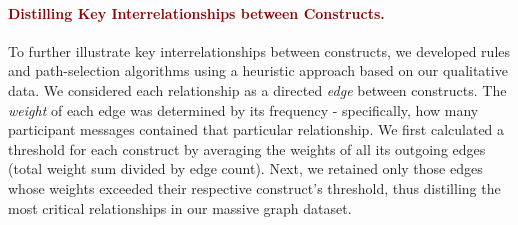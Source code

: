 \paragraph{\textcolor{darkred}{\textbf{Distilling Key Interrelationships between Constructs.}}}
To further illustrate key interrelationships between constructs, we developed rules and path-selection algorithms using a heuristic approach based on our qualitative data. 
We considered each relationship as a directed \textit{edge} between constructs. 
The \textit{weight} of each edge was determined by its frequency - specifically, how many participant messages contained that particular relationship. 
We first calculated a threshold for each construct by averaging the weights of all its outgoing edges (total weight sum divided by edge count). 
Next, we retained only those edges whose weights exceeded their respective construct's threshold, thus distilling the most critical relationships in our massive graph dataset.
















